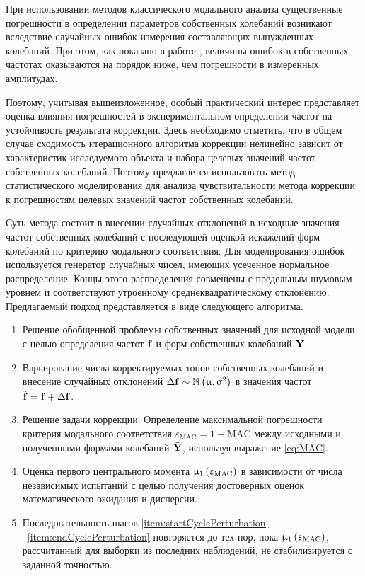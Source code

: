 При использовании методов классического модального анализа существенные погрешности в определении параметров собственных колебаний возникают вследствие случайных ошибок измерения составляющих вынужденных колебаний. При этом, как показано в работе \cite{lib:ema:Berns}, величины ошибок в собственных частотах оказываются на порядок ниже, чем погрешности в измеренных амплитудах. 

Поэтому, учитывая вышеизложенное, особый практический интерес представляет оценка влияния погрешностей в экспериментальном определении частот на устойчивость результата коррекции. Здесь необходимо отметить, что в общем случае сходимость итерационного алгоритма коррекции нелинейно зависит от характеристик исследуемого объекта и набора целевых значений частот собственных колебаний. Поэтому предлагается использовать метод статистического моделирования для анализа чувствительности метода коррекции к погрешностям целевых значений частот собственных колебаний.

Суть метода состоит в внесении случайных отклонений в исходные значения частот собственных колебаний с последующей оценкой искажений форм колебаний по критерию модального соответствия. Для моделирования ошибок используется генератор случайных чисел, имеющих усеченное нормальное распределение. Концы этого распределения совмещены с предельным шумовым уровнем и соответствуют утроенному среднеквадратическому отклонению. Предлагаемый подход представляется в виде следующего алгоритма.
\begin{enumerate}[noitemsep]
	\item Решение обобщенной проблемы собственных значений для исходной модели с целью определения частот $ \mathbf{f} $ и форм собственных колебаний $ \mathbf{Y} $.
	\item Варьирование числа корректируемых тонов собственных колебаний и внесение случайных отклонений $ \Delta \mathbf{f} \sim \mathbb{N} \left( \upmu, \upsigma^2 \right) $ в значения частот $ \tilde{\mathbf{f}} = \mathbf{f} + \Delta \mathbf{f} $. \label{item:startCyclePerturbation}
	\item Решение задачи коррекции. Определение максимальной погрешности критерия модального соответствия $\varepsilon_{\mathrm{MAC}} = 1 - \mathrm{MAC}$ между исходными и полученными формами колебаний $ \tilde{\mathbf{Y}}$, используя выражение \eqref{eq:MAC}.
	\item Оценка первого центрального момента $ \upmu_1\left( \upvarepsilon_{\mathrm{MAC}} \right) $ в зависимости от числа независимых испытаний с целью получения достоверных оценок математического ожидания и дисперсии. \label{item:endCyclePerturbation}
	\item Последовательность шагов \ref{item:startCyclePerturbation}~--~\ref{item:endCyclePerturbation} повторяется до тех пор, пока $ \upmu_1\left( \upvarepsilon_{\mathrm{MAC}} \right) $, рассчитанный для выборки из последних наблюдений, не стабилизируется с заданной точностью.
\end{enumerate}

